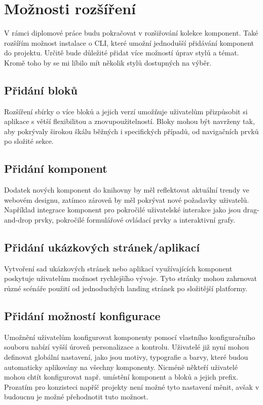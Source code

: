 
\chapter{Možnosti rozšíření}

V rámci diplomové práce budu pokračovat v rozšiřování kolekce komponent. Také rozšířím možnost instalace o CLI, které umožní
jednodušší přidávání komponent do projektu. Určitě bude důležité přidat více možností úprav stylů a témat. Kromě toho by se
mi líbilo mít několik stylů dostupných na výběr.


\section{Přidání bloků}
Rozšíření sbírky o více bloků a jejich verzí umožňuje uživatelům přizpůsobit si aplikace s větší flexibilitou a znovupoužitelností. Bloky mohou být navrženy tak, aby pokrývaly širokou škálu běžných i specifických případů, od navigačních prvků po složité sekce.

\section{Přidání komponent}
Dodatek nových komponent do knihovny by měl reflektovat aktuální trendy ve webovém designu, zatímco zároveň by měl pokrývat nové požadavky uživatelů. Například integrace komponent pro pokročilé uživatelské interakce jako jsou drag-and-drop prvky, pokročilé formulářové ovládací prvky a interaktivní grafy.

\section{Přidání ukázkových stránek/aplikací}
Vytvoření sad ukázkových stránek nebo aplikací využívajících komponent poskytuje uživatelům možnost rychlejšího vývoje. Tyto stránky mohou zahrnovat různé scénáře použití od jednoduchých landing stránek po složitější platformy.

\section{Přidání možností konfigurace}
Umožnění uživatelům konfigurovat komponenty pomocí vlastního konfiguračního souboru nabízí vyšší úroveň personalizace a kontrolu. Uživatelé již nyní mohou definovat globální nastavení, jako jsou motivy, typografie a barvy, které budou automaticky aplikovány na všechny komponenty. Nicméně někteří uživatelé mohou chtít konfigurovat např. umístění komponent a bloků a jejich prefix. Prozatím pro konzisteci napříč projekty není možné tyto nastavení měnit, avšak v budoucnu je možné přehodnotit tuto možnost.

